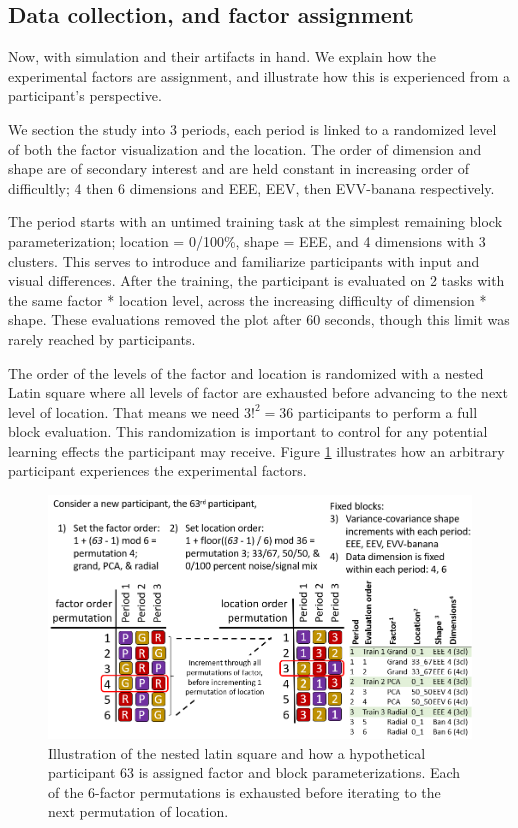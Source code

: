 \documentclass{monashthesis}
\begin{document}
\hypertarget{data-collection-and-factor-assignment}{%
\subsection{Data collection, and factor assignment}\label{data-collection-and-factor-assignment}}

Now, with simulation and their artifacts in hand. We explain how the experimental factors are assignment, and illustrate how this is experienced from a participant's perspective.

We section the study into 3 periods, each period is linked to a randomized level of both the factor visualization and the location. The order of dimension and shape are of secondary interest and are held constant in increasing order of difficultly; 4 then 6 dimensions and EEE, EEV, then EVV-banana respectively.

The period starts with an untimed training task at the simplest remaining block parameterization; location = 0/100\%, shape = EEE, and 4 dimensions with 3 clusters. This serves to introduce and familiarize participants with input and visual differences. After the training, the participant is evaluated on 2 tasks with the same factor * location level, across the increasing difficulty of dimension * shape. These evaluations removed the plot after 60 seconds, though this limit was rarely reached by participants.

The order of the levels of the factor and location is randomized with a nested Latin square where all levels of factor are exhausted before advancing to the next level of location. That means we need \(3!^2 = 36\) participants to perform a full block evaluation. This randomization is important to control for any potential learning effects the participant may receive. Figure \ref{fig:ch4fig4} illustrates how an arbitrary participant experiences the experimental factors.

\begin{figure}

{\centering \includegraphics[width=1\linewidth,]{./figures_from_script/ch4_fig4_randomization_MANUAL} 

}

\caption{Illustration of the nested latin square and how a hypothetical participant 63 is assigned factor and block parameterizations. Each of the 6-factor permutations is exhausted before iterating to the next permutation of location.}\label{fig:ch4fig4}
\end{figure}
\end{document}
